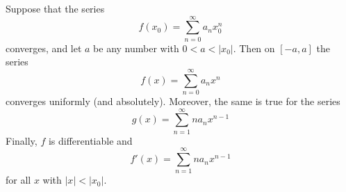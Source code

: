 \begin{thm}
    Suppose that the series \begin{equation*}
        f(x_0) = \sum\limits_{n=0}^{\infty}a_nx_0^n
    \end{equation*}
    converges, and let $a$ be any number with $0 < a < |x_0|$. Then on $[-a,a]$ the series \begin{equation*}
        f(x) = \sum\limits_{n=0}^{\infty}a_nx^n
    \end{equation*}
    converges uniformly (and absolutely). Moreover, the same is true for the series \begin{equation*}
        g(x) = \sum\limits_{n=1}^{\infty}na_nx^{n-1}
    \end{equation*}
    Finally, $f$ is differentiable and \begin{equation*}
        f'(x) = \sum\limits_{n=1}^{\infty}na_nx^{n-1}
    \end{equation*}
    for all $x$ with $|x| < |x_0|$.
\end{thm}
